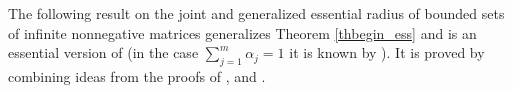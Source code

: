 \documentclass[12pt, reqno]{amsart}
\newtheorem{theorem}{Theorem}[section]
\newtheorem{corollary}[theorem]{Corollary}
\theoremstyle{definition}
\theoremstyle{remark}
\numberwithin{equation}{section}
\newcommand{\be}{\begin{equation}}
\newcommand{\ee}{\end{equation}}
\newcommand{\NN}{\mathbb{N}}
\begin{document}
%

The following result on the joint and generalized essential radius of bounded sets of infinite nonnegative matrices generalizes Theorem \ref{thbegin_ess} and is an essential version of 
 \cite[Theorem 3.3(ii)]{BP22b} (in the case $\sum_{j=1}^{m} \alpha _j= 1$ it is known by  \cite[Theorem 3.3(i)]{BP22b}).  It is proved by combining ideas from the proofs of \cite[Corollary 5.3]{P06}, \cite[Theorem 3.8]{P17+} and \cite[Theorem 3.3]{BP22b}. 
\end{document}
